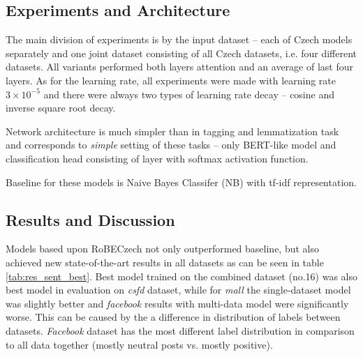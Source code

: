 \subsection{Experiments and Architecture}
The main division of experiments is by the input dataset -- each of Czech models separately and one joint dataset consisting of all Czech datasets, i.e. four different datasets. All variants performed both layers attention and an average of last four layers. As for the learning rate, all experiments were made with learning rate $3 \times 10^{-5}$ and there were always two types of learning rate decay -- cosine and inverse square root decay. 
\par
Network architecture is much simpler than in tagging and lemmatization task and corresponds to \textit{simple} setting of these tasks -- only BERT-like model and classification head consisting of layer with softmax activation function. 
\par 
Baseline for these models is Naive Bayes Classifer (NB) with tf-idf representation. 

\subsection{Results and Discussion}
Models based upon RoBECzech not only outperformed baseline, but also achieved new state-of-the-art results in all datasets as can be seen in table \ref{tab:res_sent_best}. Best model trained on the combined dataset (no.16) was also best model in evaluation on \textit{csfd} dataset, while for \textit{mall} the single-dataset model was slightly better and \textit{facebook} results with multi-data model were significantly worse. This can be caused by the a difference in distribution of labels between datasets. \textit{Facebook} dataset has the most different label distribution in comparison to all data together (mostly neutral posts vs. mostly positive).







